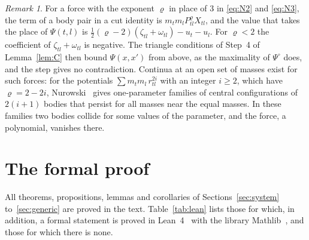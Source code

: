 \documentclass[11pt]{amsart}
\theoremstyle{definition}
\theoremstyle{remark}
\newtheorem{remark}[theorem]{Remark}
\numberwithin{equation}{section}
\newcommand{\Po}{\Psi^{\circ}}
\begin{document}
\begin{remark}\label{rem:exponent}
For a force with the exponent $\varrho$ in place of $3$ in \eqref{eq:N2} and \eqref{eq:N3}, the term
of a body pair in a cut identity is $m_t m_l P_{tl}^{\varrho} X_{tl}$, and the value that takes the
place of $\Psi(t, l)$ is $\tfrac12 (\varrho - 2)(\zeta_{tl} + \omega_{tl}) - u_t - u_l$. For
$\varrho < 2$ the coefficient of $\zeta_{tl} + \omega_{tl}$ is negative. The triangle conditions of
Step~4 of Lemma~\ref{lem:C} then bound $\Psi(x, x')$ from above, as the maximality of $\Po$ does, and
the step gives no contradiction. Continua at an open set of masses exist for such forces: for the
potentials $\sum m_t m_l\, r_{tl}^{2i}$ with an integer $i \ge 2$, which have $\varrho = 2 - 2i$,
Nurowski~\cite{nurowski2026} gives one-parameter families of central configurations of $2(i + 1)$
bodies that persist for all masses near the equal masses. In these
families two bodies collide for some values of the parameter, and the force, a polynomial, vanishes
there.
\end{remark}

\section{The formal proof}\label{sec:lean}

All theorems, propositions, lemmas and corollaries of Sections~\ref{sec:system} to~\ref{sec:generic} are
proved in the text. Table~\ref{tab:lean} lists those for which, in addition, a formal statement is
proved in Lean~4~\cite{lean4} with the library Mathlib~\cite{mathlib}, and those for which there is
none.
\end{document}
